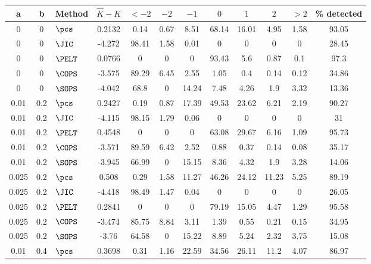 \begin{table}[ht]
\centering
\begin{tabular}{cclccccccccc}
  \hline
a & b & Method & $\hat{K} - K$ & $<-2$ & $-2$ & $-1$ & $0$ & $1$ & $2$ & $> 2$ & \% detected \\ 
  \hline
    0 &     0 & $\pcs$ & 0.2132 &  0.14 &  0.67 &  8.51 & 68.14 & 16.01 &  4.95 &  1.58 & 93.05 \\ 
      0 &     0 & $\JIC$ & -4.272 & 98.41 &  1.58 &  0.01 &     0 &     0 &     0 &     0 & 28.45 \\ 
      0 &     0 & $\PELT$ & 0.0766 &     0 &     0 &     0 & 93.43 &   5.6 &  0.87 &   0.1 &  97.3 \\ 
      0 &     0 & $\COPS$ & -3.575 & 89.29 &  6.45 &  2.55 &  1.05 &   0.4 &  0.14 &  0.12 & 34.86 \\ 
      0 &     0 & $\SOPS$ & -4.042 &  68.8 &     0 & 14.24 &  7.48 &  4.26 &   1.9 &  3.32 & 13.36 \\ 
   \hline
 0.01 &   0.2 & $\pcs$ & 0.2427 &  0.19 &  0.87 & 17.39 & 49.53 & 23.62 &  6.21 &  2.19 & 90.27 \\ 
   0.01 &   0.2 & $\JIC$ & -4.115 & 98.15 &  1.79 &  0.06 &     0 &     0 &     0 &     0 &    31 \\ 
   0.01 &   0.2 & $\PELT$ & 0.4548 &     0 &     0 &     0 & 63.08 & 29.67 &  6.16 &  1.09 & 95.73 \\ 
   0.01 &   0.2 & $\COPS$ & -3.571 & 89.59 &  6.42 &  2.52 &  0.88 &  0.37 &  0.14 &  0.08 & 35.17 \\ 
   0.01 &   0.2 & $\SOPS$ & -3.945 & 66.99 &     0 & 15.15 &  8.36 &  4.32 &   1.9 &  3.28 & 14.06 \\ 
   \hline
0.025 &   0.2 & $\pcs$ & 0.508 &  0.29 &  1.58 & 11.27 & 46.26 & 24.12 & 11.23 &  5.25 & 89.19 \\ 
  0.025 &   0.2 & $\JIC$ & -4.418 & 98.49 &  1.47 &  0.04 &     0 &     0 &     0 &     0 & 26.05 \\ 
  0.025 &   0.2 & $\PELT$ & 0.2841 &     0 &     0 &     0 & 79.19 & 15.05 &  4.47 &  1.29 & 95.58 \\ 
  0.025 &   0.2 & $\COPS$ & -3.474 & 85.75 &  8.84 &  3.11 &  1.39 &  0.55 &  0.21 &  0.15 & 34.95 \\ 
  0.025 &   0.2 & $\SOPS$ & -3.76 & 64.58 &     0 & 15.22 &  8.89 &  5.24 &  2.32 &  3.75 & 15.08 \\ 
   \hline
 0.01 &   0.4 & $\pcs$ & 0.3698 &  0.31 &  1.16 & 22.59 & 34.56 & 26.11 &  11.2 &  4.07 & 86.97 \\ 

\end{tabular}
\end{table}
